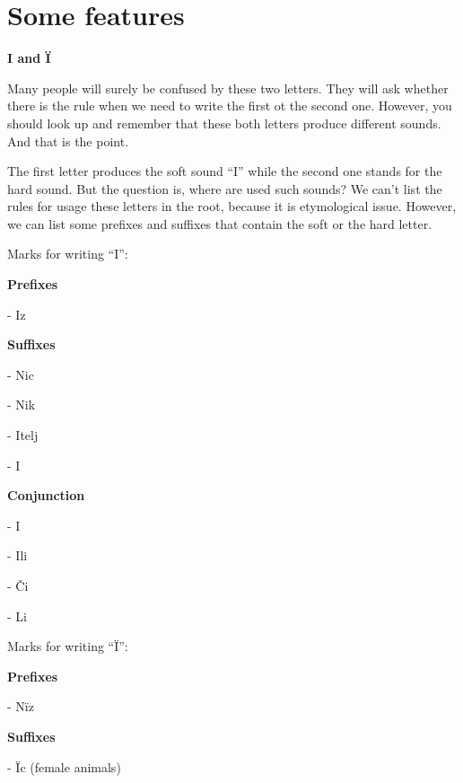 \section{Some features}

\textbf{I and Ï}

Many people will surely be confused by these two letters. They will ask whether there is the rule when we need to write the first ot the second one. However, you should look up and remember that these both letters produce different sounds. And that is the point. 

The first letter produces the soft sound “I” while the second one stands for the hard sound. But the question is, where are used such sounds? We can't list the rules for usage these letters in the root, because it is etymological issue. However, we can list some prefixes and suffixes that contain the soft or the hard letter.

Marks for writing “I”:

\textbf{Prefixes }

- Iz

\textbf{Suffixes}

- Nic

- Nik

- Itelj

- I

\textbf{Conjunction}

- I

- Ili

- Či

- Li

Marks for writing “Ï”:

\textbf{Prefixes}

- Nïz

\textbf{Suffixes}

- Ïc (female animals)
